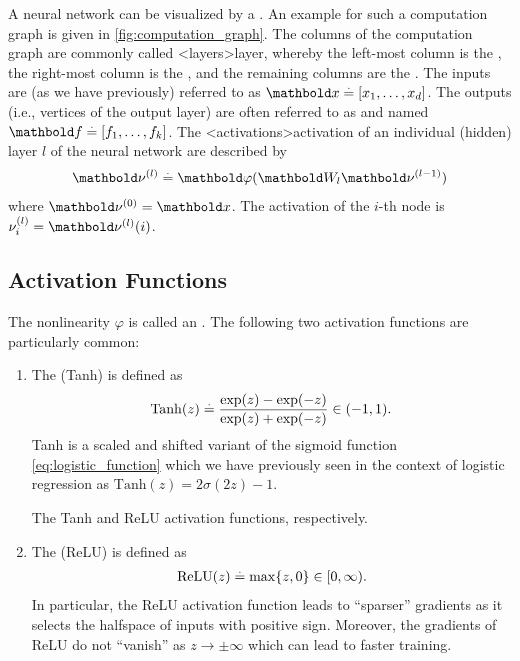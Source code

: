 A neural network can be visualized by a .
An example for such a computation graph is given in \cref{fig:computation_graph}.
The columns of the computation graph are commonly called \midx<layers>{layer}, whereby the left-most column is the , the right-most column is the , and the remaining columns are the .
The inputs are (as we have previously) referred to as $\vx \defeq [x_1, \dots, x_d]$.
The outputs (i.e., vertices of the output layer) are often referred to as  and named $\vf \defeq [f_1, \dots, f_k]$.
The \midx<activations>{activation} of an individual (hidden) layer $l$ of the neural network are described by \begin{align}
  \vnu^{(l)} \defeq \vvarphi(\mW_l \vnu^{(l-1)})
\end{align} where $\vnu^{(0)} = \vx$.
The activation of the $i$-th node is $\nu_i^{(l)} = \vnu^{(l)}(i)$.

\subsection{Activation Functions}

The nonlinearity $\varphi$ is called an .
The following two activation functions are particularly common: \begin{enumerate}
  \item The  (Tanh) is defined as \begin{align}
    \mathrm{Tanh}(z) \overset{.}{=} \frac{\exp(z) - \exp(-z)}{\exp(z) + \exp(-z)} \in (-1, 1).
  \end{align}
  Tanh is a scaled and shifted variant of the sigmoid function \eqref{eq:logistic_function} which we have previously seen in the context of logistic regression as $\mathrm{Tanh}(z) = 2 \sigma(2 z) - 1$.

  \begin{marginfigure}
    \caption{The Tanh and ReLU activation functions, respectively.}
  \end{marginfigure}

  \item The  (ReLU) is defined as \begin{align}
    \mathrm{ReLU}(z) \overset{.}{=} \max \{z, 0\} \in [0, \infty).
  \end{align}
  In particular, the ReLU activation function leads to ``sparser'' gradients as it selects the halfspace of inputs with positive sign.
  Moreover, the gradients of ReLU do not ``vanish'' as $z \to \pm \infty$ which can lead to faster training.
\end{enumerate}

